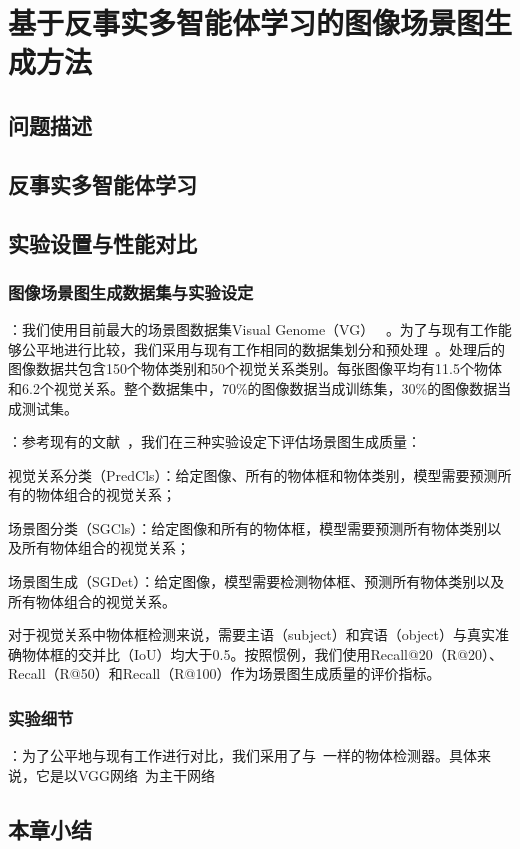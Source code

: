 \chapter{基于反事实多智能体学习的图像场景图生成方法}

\section{问题描述}

\section{反事实多智能体学习}

\section{实验设置与性能对比}
\subsection{图像场景图生成数据集与实验设定}

：我们使用目前最大的场景图数据集Visual Genome（VG） ~\cite{krishna2017visual}。为了与现有工作能够公平地进行比较，我们采用与现有工作相同的数据集划分和预处理~\cite{xu2017scene, zellers2018neural, newell2017pixels, yang2018graph, herzig2018mapping}。处理后的图像数据共包含150个物体类别和50个视觉关系类别。每张图像平均有11.5个物体和6.2个视觉关系。整个数据集中，70\%的图像数据当成训练集，30\%的图像数据当成测试集。


：参考现有的文献~\cite{xu2017scene, zellers2018neural, jae2018tensorize}，我们在三种实验设定下评估场景图生成质量：
\begin{asparaenum}
\item 视觉关系分类（PredCls）：给定图像、所有的物体框和物体类别，模型需要预测所有的物体组合的视觉关系；

\item 场景图分类（SGCls）：给定图像和所有的物体框，模型需要预测所有物体类别以及所有物体组合的视觉关系；

\item 场景图生成（SGDet）：给定图像，模型需要检测物体框、预测所有物体类别以及所有物体组合的视觉关系。
\end{asparaenum}

对于视觉关系中物体框检测来说，需要主语（subject）和宾语（object）与真实准确物体框的交并比（IoU）均大于0.5。按照惯例，我们使用Recall@20（R@20）、Recall（R@50）和Recall（R@100）作为场景图生成质量的评价指标。


\subsection{实验细节}


：为了公平地与现有工作进行对比，我们采用了与~\cite{zellers2018neural}一样的物体检测器。具体来说，它是以VGG网络~\cite{simonyan2015very}为主干网络






\section{本章小结}